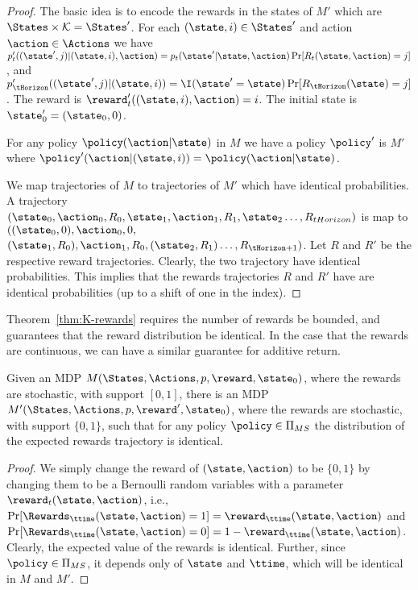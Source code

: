 \begin{proof}
The basic idea is to encode the rewards in the states of $M'$ which
are
$\States\times {\cal K}=\States'$.
%
For each $(\state,i)\in \States'$ and action $\action\in\Actions$ we
have
$p'_t((\state',j)|(\state,i),\action)=p_t(\state'|\state,\action)\Pr[R_t(\state,\action)=j]$,
and
$p'_{\tHorizon}((\state',j)|(\state,i))=\I(\state'=\state)\Pr[R_{\tHorizon}(\state)=j]$.
The reward is $\reward'_t((\state,i),\action)=i$. The initial state
is $\state'_0=(\state_0,0)$.

For any policy $\policy(\action|\state)$ in $M$ we have a policy
$\policy'$ is $M'$ where
$\policy'(\action|(\state,i))=\policy(\action|\state)$.

We map trajectories of $M$ to trajectories of $M'$ which have
identical probabilities. A trajectory $(\state_0, \action_0 , R_0 ,
\state_1,\action_1,R_1, \state_2 \ldots, R_{tHorizon})$ is map to
$((\state_0,0), \action_0 , 0 ,$ $ (\state_1,R_0),\action_1,R_0,
(\state_2,R_1) \ldots, R_{\tHorizon+1})$. Let $R$ and $R'$ be the
respective reward trajectories.
%
Clearly, the two trajectory have identical probabilities. This
implies that the rewards trajectories $R$ and $R'$ have are
identical probabilities (up to a shift of one in the index).
\end{proof}

Theorem~\ref{thm:K-rewards} requires the number of rewards be
bounded, and guarantees that the reward distribution be identical.
In the case that the rewards are continuous, we can have a similar
guarantee for additive return.


\begin{theorem}
Given an MDP $M(\States,\Actions,p,\reward,\state_0)$, where the
rewards are stochastic, with support $[0,1]$, there is an MDP
$M'(\States,\Actions,p,\reward',\state_0)$, where the rewards are
stochastic, with support $\{0,1\}$,
such that for any policy $\policy\in \Pi_{MS}$ the distribution of
the expected rewards trajectory is identical.
\end{theorem}

\begin{proof}
We simply change the reward of $(\state,\action)$ to be $\{0,1\}$ by
changing them to be a Bernoulli random variables with a parameter
$\reward_t(\state,\action)$, i.e.,
$\Pr[\Rewards_\ttime(\state,\action)=1]=\reward_\ttime(\state,\action)$
and
$\Pr[\Rewards_\ttime(\state,\action)=0]=1-\reward_\ttime(\state,\action)$.
Clearly, the expected value of the rewards is identical. Further,
since $\policy\in \Pi_{MS}$, it depends only of $\state$ and
$\ttime$, which will be identical in $M$ and $M'$.
\end{proof}

